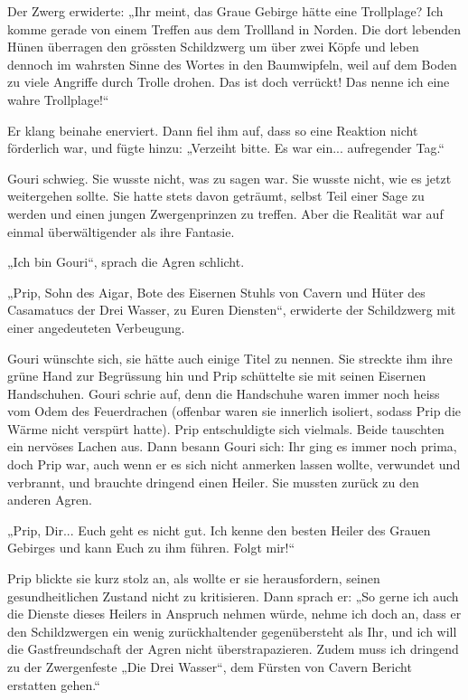 Der Zwerg erwiderte: „Ihr meint, das Graue Gebirge hätte eine Trollplage? Ich komme gerade von einem Treffen aus dem Trollland in Norden. Die dort lebenden Hünen überragen den grössten Schildzwerg um über zwei Köpfe und leben dennoch im wahrsten Sinne des Wortes in den Baumwipfeln, weil auf dem Boden zu viele Angriffe durch Trolle drohen. Das ist doch verrückt! Das nenne ich eine wahre Trollplage!“

Er klang beinahe enerviert. Dann fiel ihm auf, dass so eine Reaktion nicht förderlich war, und fügte hinzu: „Verzeiht bitte. Es war ein... aufregender Tag.“

Gouri schwieg. Sie wusste nicht, was zu sagen war. Sie wusste nicht, wie es jetzt weitergehen sollte. Sie hatte stets davon geträumt, selbst Teil einer Sage zu werden und einen jungen Zwergenprinzen zu treffen. Aber die Realität war auf einmal überwältigender als ihre Fantasie.

„Ich bin Gouri“, sprach die Agren schlicht.

„Prip, Sohn des Aigar, Bote des Eisernen Stuhls von Cavern und Hüter des Casamatucs der Drei Wasser, zu Euren Diensten“, erwiderte der Schildzwerg mit einer angedeuteten Verbeugung.

Gouri wünschte sich, sie hätte auch einige Titel zu nennen. Sie streckte ihm ihre grüne Hand zur Begrüssung hin und Prip schüttelte sie mit seinen Eisernen Handschuhen. Gouri schrie auf, denn die Handschuhe waren immer noch heiss vom Odem des Feuerdrachen (offenbar waren sie innerlich isoliert, sodass Prip die Wärme nicht verspürt hatte). Prip entschuldigte sich vielmals. Beide tauschten ein nervöses Lachen aus. Dann besann Gouri sich: Ihr ging es immer noch prima, doch Prip war, auch wenn er es sich nicht anmerken lassen wollte, verwundet und verbrannt, und brauchte dringend einen Heiler. Sie mussten zurück zu den anderen Agren.

„Prip, Dir... Euch geht es nicht gut. Ich kenne den besten Heiler des Grauen Gebirges und kann Euch zu ihm führen. Folgt mir!“

Prip blickte sie kurz stolz an, als wollte er sie herausfordern, seinen gesundheitlichen Zustand nicht zu kritisieren. Dann sprach er: „So gerne ich auch die Dienste dieses Heilers in Anspruch nehmen würde, nehme ich doch an, dass er den Schildzwergen ein wenig zurückhaltender gegenübersteht als Ihr, und ich will die Gastfreundschaft der Agren nicht überstrapazieren. Zudem muss ich dringend zu der Zwergenfeste „Die Drei Wasser“, dem Fürsten von Cavern Bericht erstatten gehen.“

